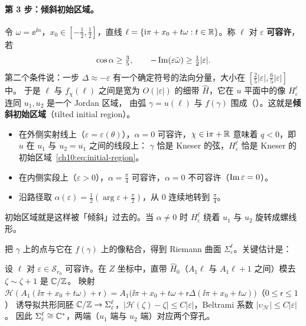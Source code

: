 \paragraph{第 3 步：倾斜初始区域。}
令 $\omega=\ee^{\ii\alpha}$，$x_0\in[-\tfrac12,\tfrac12]$，直线 $\ell=\{\mathrm{i}\pi+x_0+t\omega:t\in\mathbb{R}\}$。称 $\ell$ 对 $\varepsilon$ \textbf{可容许}，若
\begin{equation}\label{ch10:eq:admissible}
  \cos\alpha\ge\tfrac35,\qquad -\operatorname{Im}(\varepsilon\bar\omega)\ge\tfrac12|\varepsilon| .
\end{equation}
第二个条件说：一步 $\Delta\approx-\varepsilon$ 有一个确定符号的法向分量，大小在 $[\tfrac25|\varepsilon|,\tfrac65|\varepsilon|]$ 中。
于是 $\ell$ 与 $f_\chi(\ell)$ 之间是宽为 $O(|\varepsilon|)$ 的细带 $\hat H$，它在 $u$ 平面中的像 $H^\ell_\varepsilon$ 连同 $u_1,u_2$ 是一个 Jordan 区域，
由弧 $\gamma=u(\ell)$ 与 $f(\gamma)$ 围成（\cite[引理~10.3]{KneserPaper}）。这就是\textbf{倾斜初始区域}（tilted initial region）。
\begin{itemize}
\item 在外侧实射线上（$\varepsilon=\varepsilon(\theta)$），$\alpha=0$ 可容许，$\chi\in\mathrm{i}\pi+\mathbb{R}$ 意味着 $q<0$，即 $u$ 在 $u_1$ 与 $u_2=\overline{u_1}$ 之间的线段上：
  $\gamma$ 恰是 Kneser 的弦，$H^\ell_\varepsilon$ 恰是 Kneser 的初始区域~\eqref{ch10:eq:initial-region}。
\item 在内侧实段上（$\varepsilon>0$），$\alpha=\tfrac\pi4$ 可容许，$\alpha=0$ 不可容许（$\operatorname{Im}\varepsilon=0$）。
\item 沿路径取 $\alpha(\varepsilon)=\tfrac12(\arg\varepsilon+\tfrac\pi2)$，从 $0$ 连续地转到 $\tfrac\pi4$。
\end{itemize}
初始区域就是这样被「倾斜」过去的。当 $\alpha\neq0$ 时 $H^\ell_\varepsilon$ 绕着 $u_1$ 与 $u_2$ 旋转成螺线形。

把 $\gamma$ 上的点与它在 $f(\gamma)$ 上的像粘合，得到 Riemann 曲面 $\Sigma^\ell_\varepsilon$。关键估计是：

\begin{lemma}\label{ch10:lem:flat}
设 $\ell$ 对 $\varepsilon\in\mathcal S_{r_0}$ 可容许。在 $Z$ 坐标中，直带 $\hat H_0$（$A_1\ell$ 与 $A_1\ell+1$ 之间）模去 $\zeta\sim\zeta+1$ 是 $\mathbb{C}/\mathbb{Z}$。
映射 $\mathcal H(A_1(\ii\pi+x_0+t\omega)+\mathsf r)=A_1\bigl(\ii\pi+x_0+t\omega+\mathsf r\Delta(\ii\pi+x_0+t\omega)\bigr)$（$0\le\mathsf r\le1$）
诱导拟共形同胚 $\mathbb{C}/\mathbb{Z}\to\Sigma^\ell_\varepsilon$，$|\mathcal H(\zeta)-\zeta|\le C|\varepsilon|$，Beltrami 系数 $|\upsilon_{\mathcal H}|\le C|\varepsilon|$。
因此 $\Sigma^\ell_\varepsilon\cong\mathbb{C}^*$，两端（$u_1$ 端与 $u_2$ 端）对应两个穿孔。
\end{lemma}

